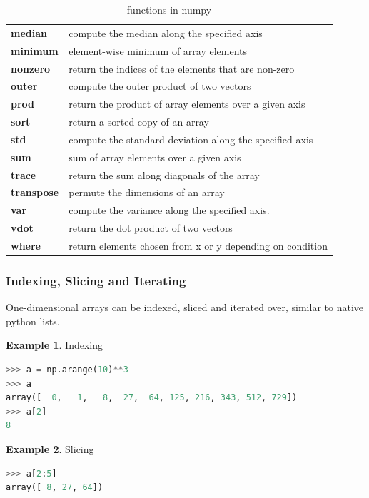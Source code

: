 \documentclass{article}
\theoremstyle{definition}
\newtheorem{ex}{Example}[subsection]
\theoremstyle{remark}
\begin{document}
\begin{table}[h!]
\begin{tabular}{p{2cm} p{10cm}}
    \textbf{median} & compute the median along the specified axis \\
    \textbf{minimum} & element-wise minimum of array elements \\
    \textbf{nonzero} & return the indices of the elements that are non-zero \\
    \textbf{outer} & compute the outer product of two vectors \\
    \textbf{prod} & return the product of array elements over a given axis \\
    \textbf{sort} & return a sorted copy of an array \\
    \textbf{std} & compute the standard deviation along the specified axis \\
    \textbf{sum} & sum of array elements over a given axis \\
    \textbf{trace} & return the sum along diagonals of the array \\
    \textbf{transpose} & permute the dimensions of an array \\
    \textbf{var} & compute the variance along the specified axis. \\
    \textbf{vdot} & return the dot product of two vectors \\
    \textbf{where} & return elements chosen from x or y depending on condition \\
    \hline
\end{tabular}
\caption{functions in numpy}
\label{table:1}
\end{table}

\clearpage
    
\subsubsection{Indexing, Slicing and Iterating}

One-dimensional arrays can be indexed, sliced and iterated over, similar to native python lists.

\begin{ex}Indexing 
\begin{lstlisting}[language=Python]
>>> a = np.arange(10)**3
>>> a
array([  0,   1,   8,  27,  64, 125, 216, 343, 512, 729])
>>> a[2]
8
\end{lstlisting}
\end{ex}

\begin{ex}Slicing
\begin{lstlisting}[language=Python]
>>> a[2:5]
array([ 8, 27, 64])
\end{lstlisting}
\end{ex}
\end{document}

